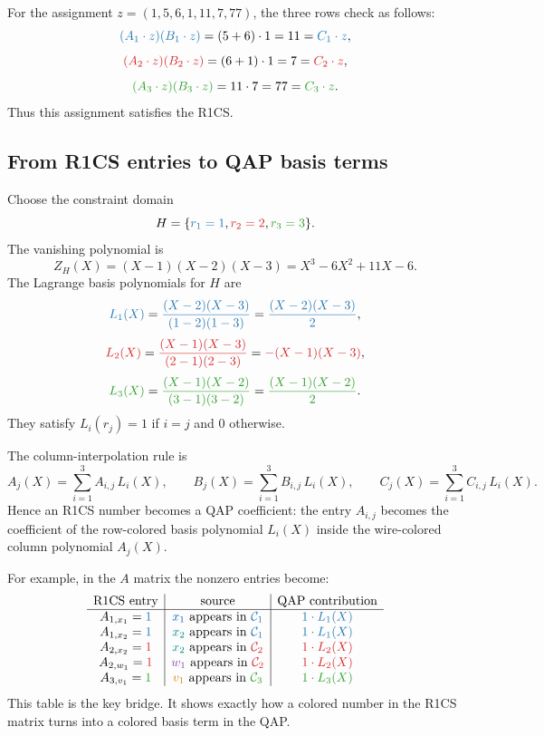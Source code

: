 \documentclass[11pt]{article}
\newcommand{\xone}[1]{\textcolor{wirexonecolor}{#1}}
\newcommand{\xtwo}[1]{\textcolor{wirextwocolor}{#1}}
\newcommand{\wone}[1]{\textcolor{wirewonecolor}{#1}}
\newcommand{\vone}[1]{\textcolor{wirevonecolor}{#1}}
\newcommand{\rowone}[1]{\textcolor{rowonecolor}{#1}}
\newcommand{\rowtwo}[1]{\textcolor{rowtwocolor}{#1}}
\newcommand{\rowthree}[1]{\textcolor{rowthreecolor}{#1}}
\begin{document}
For the assignment $z=(1,5,6,1,11,7,77)$, the three rows check as follows:
\[
    \rowone{(A_1\cdot z)(B_1\cdot z)}=(5+6)\cdot1=11=\rowone{C_1\cdot z},
\]
\[
    \rowtwo{(A_2\cdot z)(B_2\cdot z)}=(6+1)\cdot1=7=\rowtwo{C_2\cdot z},
\]
\[
    \rowthree{(A_3\cdot z)(B_3\cdot z)}=11\cdot7=77=\rowthree{C_3\cdot z}.
\]
Thus this assignment satisfies the R1CS.

\subsection{From R1CS entries to QAP basis terms}

Choose the constraint domain
\[
    H=\{\rowone{r_1=1},\rowtwo{r_2=2},\rowthree{r_3=3}\}.
\]
The vanishing polynomial is
\[
    Z_H(X)=(X-1)(X-2)(X-3)=X^3-6X^2+11X-6.
\]
The Lagrange basis polynomials for $H$ are
\[
    \rowone{L_1(X)}=\rowone{\frac{(X-2)(X-3)}{(1-2)(1-3)}}=\rowone{\frac{(X-2)(X-3)}{2}},
\]
\[
    \rowtwo{L_2(X)}=\rowtwo{\frac{(X-1)(X-3)}{(2-1)(2-3)}}=\rowtwo{-(X-1)(X-3)},
\]
\[
    \rowthree{L_3(X)}=\rowthree{\frac{(X-1)(X-2)}{(3-1)(3-2)}}=\rowthree{\frac{(X-1)(X-2)}{2}}.
\]
They satisfy $L_i(r_j)=1$ if $i=j$ and $0$ otherwise.

The column-interpolation rule is
\[
\boxed{
    A_j(X)=\sum_{i=1}^{3} A_{i,j}\,L_i(X),
    \qquad
    B_j(X)=\sum_{i=1}^{3} B_{i,j}\,L_i(X),
    \qquad
    C_j(X)=\sum_{i=1}^{3} C_{i,j}\,L_i(X).
}
\]
Hence an R1CS number becomes a QAP coefficient: the entry $A_{i,j}$ becomes the coefficient of the row-colored basis polynomial $L_i(X)$ inside the wire-colored column polynomial $A_j(X)$.

For example, in the $A$ matrix the nonzero entries become:
\[
\begin{array}{c|c|c}
\text{R1CS entry} & \text{source} & \text{QAP contribution} \\
\hline
A_{1,x_1}=\rowone{1} & \xone{x_1}\text{ appears in }\rowone{\mathcal C_1} & \rowone{1\cdot L_1(X)} \\
A_{1,x_2}=\rowone{1} & \xtwo{x_2}\text{ appears in }\rowone{\mathcal C_1} & \rowone{1\cdot L_1(X)} \\
A_{2,x_2}=\rowtwo{1} & \xtwo{x_2}\text{ appears in }\rowtwo{\mathcal C_2} & \rowtwo{1\cdot L_2(X)} \\
A_{2,w_1}=\rowtwo{1} & \wone{w_1}\text{ appears in }\rowtwo{\mathcal C_2} & \rowtwo{1\cdot L_2(X)} \\
A_{3,v_1}=\rowthree{1} & \vone{v_1}\text{ appears in }\rowthree{\mathcal C_3} & \rowthree{1\cdot L_3(X)}
\end{array}
\]
This table is the key bridge. It shows exactly how a colored number in the R1CS matrix turns into a colored basis term in the QAP.
\end{document}
